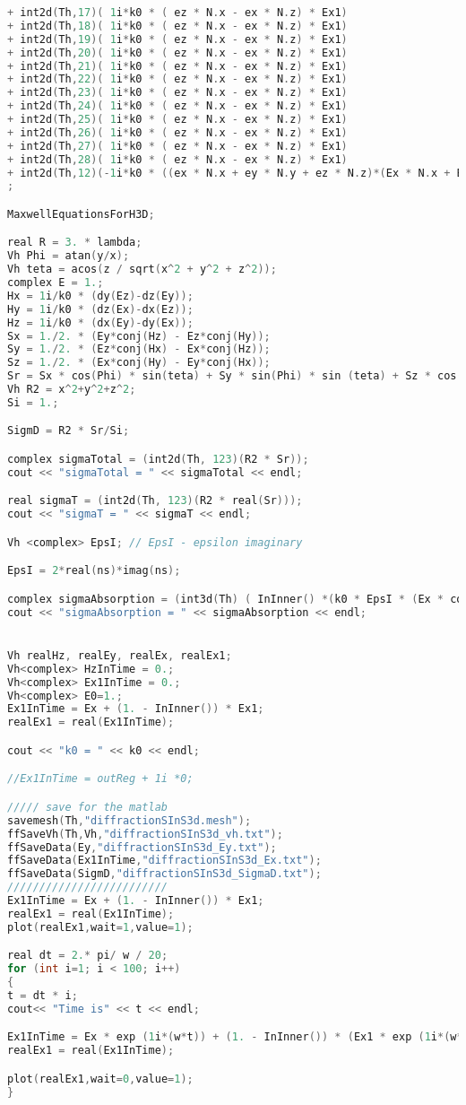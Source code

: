 \begin{lstlisting}[language=C]
+ int2d(Th,17)( 1i*k0 * ( ez * N.x - ex * N.z) * Ex1)
+ int2d(Th,18)( 1i*k0 * ( ez * N.x - ex * N.z) * Ex1)
+ int2d(Th,19)( 1i*k0 * ( ez * N.x - ex * N.z) * Ex1)
+ int2d(Th,20)( 1i*k0 * ( ez * N.x - ex * N.z) * Ex1)
+ int2d(Th,21)( 1i*k0 * ( ez * N.x - ex * N.z) * Ex1)
+ int2d(Th,22)( 1i*k0 * ( ez * N.x - ex * N.z) * Ex1)
+ int2d(Th,23)( 1i*k0 * ( ez * N.x - ex * N.z) * Ex1)
+ int2d(Th,24)( 1i*k0 * ( ez * N.x - ex * N.z) * Ex1)
+ int2d(Th,25)( 1i*k0 * ( ez * N.x - ex * N.z) * Ex1)
+ int2d(Th,26)( 1i*k0 * ( ez * N.x - ex * N.z) * Ex1)
+ int2d(Th,27)( 1i*k0 * ( ez * N.x - ex * N.z) * Ex1)
+ int2d(Th,28)( 1i*k0 * ( ez * N.x - ex * N.z) * Ex1)
+ int2d(Th,12)(-1i*k0 * ((ex * N.x + ey * N.y + ez * N.z)*(Ex * N.x + Ey * N.y + Ez * N.z) - (Ex * ex + Ey * ey + Ez * ez)))
;

MaxwellEquationsForH3D;

real R = 3. * lambda;
Vh Phi = atan(y/x);
Vh teta = acos(z / sqrt(x^2 + y^2 + z^2));
complex E = 1.;
Hx = 1i/k0 * (dy(Ez)-dz(Ey));
Hy = 1i/k0 * (dz(Ex)-dx(Ez));
Hz = 1i/k0 * (dx(Ey)-dy(Ex));
Sx = 1./2. * (Ey*conj(Hz) - Ez*conj(Hy));
Sy = 1./2. * (Ez*conj(Hx) - Ex*conj(Hz));
Sz = 1./2. * (Ex*conj(Hy) - Ey*conj(Hx));
Sr = Sx * cos(Phi) * sin(teta) + Sy * sin(Phi) * sin (teta) + Sz * cos(teta);
Vh R2 = x^2+y^2+z^2;
Si = 1.;

SigmD = R2 * Sr/Si;

complex sigmaTotal = (int2d(Th, 123)(R2 * Sr));
cout << "sigmaTotal = " << sigmaTotal << endl;

real sigmaT = (int2d(Th, 123)(R2 * real(Sr)));
cout << "sigmaT = " << sigmaT << endl;

Vh <complex> EpsI; // EpsI - epsilon imaginary

EpsI = 2*real(ns)*imag(ns);

complex sigmaAbsorption = (int3d(Th) ( InInner() *(k0 * EpsI * (Ex * conj(Ex)  +   Ey * conj(Ey) +   Ez * conj(Ez))))); 
cout << "sigmaAbsorption = " << sigmaAbsorption << endl;		 


Vh realHz, realEy, realEx, realEx1;
Vh<complex> HzInTime = 0.;
Vh<complex> Ex1InTime = 0.;
Vh<complex> E0=1.;
Ex1InTime = Ex + (1. - InInner()) * Ex1;
realEx1 = real(Ex1InTime);

cout << "k0 = " << k0 << endl;

//Ex1InTime = outReg + 1i *0;

///// save for the matlab
savemesh(Th,"diffractionSInS3d.mesh");
ffSaveVh(Th,Vh,"diffractionSInS3d_vh.txt");
ffSaveData(Ey,"diffractionSInS3d_Ey.txt");
ffSaveData(Ex1InTime,"diffractionSInS3d_Ex.txt");
ffSaveData(SigmD,"diffractionSInS3d_SigmaD.txt");
/////////////////////////
Ex1InTime = Ex + (1. - InInner()) * Ex1;
realEx1 = real(Ex1InTime);
plot(realEx1,wait=1,value=1);

real dt = 2.* pi/ w / 20;
for (int i=1; i < 100; i++)
{
t = dt * i;
cout<< "Time is" << t << endl;

Ex1InTime = Ex * exp (1i*(w*t)) + (1. - InInner()) * (Ex1 * exp (1i*(w*t)));
realEx1 = real(Ex1InTime);

plot(realEx1,wait=0,value=1);
}
\end{lstlisting}